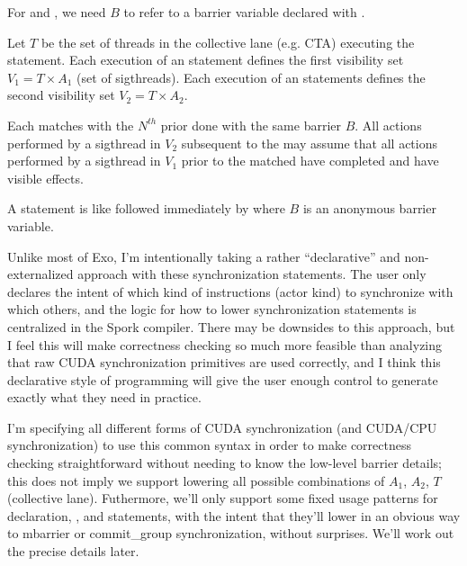 \filbreak
For  and , we need $B$ to refer to a barrier variable declared with .

\filbreak
Let $T$ be the set of threads in the collective lane (e.g. CTA) executing the statement.
Each execution of an  statement defines the first visibility set $V_1 = T \times A_1$ (set of sigthreads).
Each execution of an  statements defines the second visibility set $V_2 = T \times A_2$.

\filbreak
Each  matches with the $N^{th}$ prior  done with the same barrier $B$.
All actions performed by a sigthread in $V_2$ subsequent to the  may assume that all actions performed by a sigthread in $V_1$ prior to the matched  have completed and have visible effects.

\filbreak
A  statement is like  followed immediately by  where $B$ is an anonymous barrier variable.

\filbreak
Unlike most of Exo, I'm intentionally taking a rather ``declarative'' and non-externalized approach with these synchronization statements.
The user only declares the intent of which kind of instructions (actor kind) to synchronize with which others, and the logic for how to lower synchronization statements is centralized in the Spork compiler.
There may be downsides to this approach, but I feel this will make correctness checking so much more feasible than analyzing that raw CUDA synchronization primitives are used correctly, and I think this declarative style of programming will give the user enough control to generate exactly what they need in practice.

\filbreak
I'm specifying all different forms of CUDA synchronization (and CUDA/CPU synchronization) to use this common syntax in order to make correctness checking straightforward without needing to know the low-level barrier details; this does not imply we support lowering all possible combinations of $A_1$, $A_2$, $T$ (collective lane).
Futhermore, we'll only support some fixed usage patterns for  declaration, , and  statements, with the intent that they'll lower in an obvious way to mbarrier or commit\_group synchronization, without surprises.
We'll work out the precise details later.


